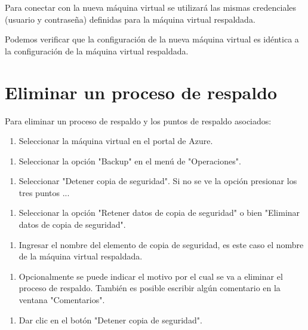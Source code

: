 Para conectar con la nueva máquina virtual se utilizará las mismas credenciales (usuario y contraseña) definidas para la máquina virtual respaldada.

Podemos verificar que la configuración de la nueva máquina virtual es idéntica a la configuración de la máquina virtual respaldada.

\section{Eliminar un proceso de respaldo}

Para eliminar un proceso de respaldo y los puntos de respaldo asociados:

\begin{enumerate}
\item Seleccionar la máquina virtual en el portal de Azure.
\end{enumerate}

\begin{enumerate}
\item Seleccionar la opción "Backup" en el menú de "Operaciones".
\end{enumerate}

\begin{enumerate}
\item Seleccionar "Detener copia de seguridad". Si no se ve la opción presionar los tres puntos ...
\end{enumerate}

\begin{enumerate}
\item Seleccionar la opción "Retener datos de copia de seguridad" o bien "Eliminar datos de copia de seguridad".
\end{enumerate}

\begin{enumerate}
\item Ingresar el nombre del elemento de copia de seguridad, es este caso el nombre de la máquina virtual respaldada.
\end{enumerate}

\begin{enumerate}
\item Opcionalmente se puede indicar el motivo por el cual se va a eliminar el proceso de respaldo. También es posible escribir algún comentario en la ventana "Comentarios".
\end{enumerate}

\begin{enumerate}
\item Dar clic en el botón "Detener copia de seguridad".
\end{enumerate}


